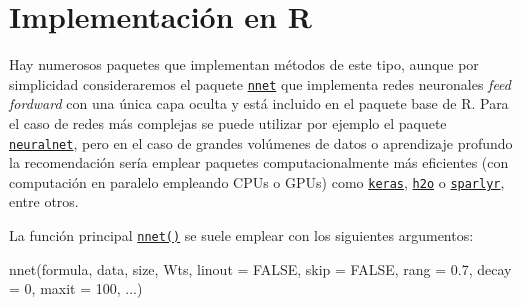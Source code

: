 \documentclass[
]{book}
\newenvironment{Shaded}{\begin{snugshade}}{\end{snugshade}}
\newcommand{\AttributeTok}[1]{\textcolor[rgb]{0.77,0.63,0.00}{#1}}
\newcommand{\ConstantTok}[1]{\textcolor[rgb]{0.00,0.00,0.00}{#1}}
\newcommand{\DecValTok}[1]{\textcolor[rgb]{0.00,0.00,0.81}{#1}}
\newcommand{\FloatTok}[1]{\textcolor[rgb]{0.00,0.00,0.81}{#1}}
\newcommand{\FunctionTok}[1]{\textcolor[rgb]{0.00,0.00,0.00}{#1}}
\newcommand{\NormalTok}[1]{#1}
\theoremstyle{break}
\theoremstyle{nonumberplain}
\begin{document}
\hypertarget{implementaciuxf3n-en-r-2}{%
\section{Implementación en R}\label{implementaciuxf3n-en-r-2}}

Hay numerosos paquetes que implementan métodos de este tipo, aunque por simplicidad consideraremos el paquete \href{https://CRAN.R-project.org/package=nnet}{\texttt{nnet}} que implementa redes neuronales \emph{feed fordward} con una única capa oculta y está incluido en el paquete base de R.
Para el caso de redes más complejas se puede utilizar por ejemplo el paquete \href{https://github.com/bips-hb/neuralnet}{\texttt{neuralnet}}, pero en el caso de grandes volúmenes de datos o aprendizaje profundo la recomendación sería emplear paquetes computacionalmente más eficientes (con computación en paralelo empleando CPUs o GPUs) como \href{https://keras.rstudio.com}{\texttt{keras}}, \href{https://github.com/h2oai/h2o-3}{\texttt{h2o}} o \href{https://spark.rstudio.com/}{\texttt{sparlyr}}, entre otros.

La función principal \href{https://rdrr.io/pkg/nnet/man/nnet.html}{\texttt{nnet()}} se suele emplear con los siguientes argumentos:

\begin{Shaded}
\begin{Highlighting}[]
\FunctionTok{nnet}\NormalTok{(formula, data, size, Wts, }\AttributeTok{linout =} \ConstantTok{FALSE}\NormalTok{, }\AttributeTok{skip =} \ConstantTok{FALSE}\NormalTok{, }
     \AttributeTok{rang =} \FloatTok{0.7}\NormalTok{, }\AttributeTok{decay =} \DecValTok{0}\NormalTok{, }\AttributeTok{maxit =} \DecValTok{100}\NormalTok{, ...)}
\end{Highlighting}
\end{Shaded}
\end{document}
